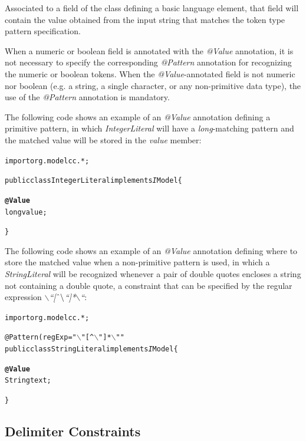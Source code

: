 \documentclass[a4paper,twoside,onecolumn]{article}
\newenvironment{colframe}{%
  \begin{Sbox} 
    \begin{minipage}{.8\columnwidth} 
}{%

  \end{minipage} 
  \end{Sbox} 
  \begin{center} 
    \fcolorbox{black}{MyGray}{\TheSbox} 
  \end{center} 
}
\newcommand{\an}[1]{\emph{#1}} %
\begin{document}
Associated to a field of the class defining a basic language element, that field will contain the value obtained from the input string that
matches the token type pattern specification.

When a numeric or boolean field is annotated with the \an{@Value} annotation, it is not necessary to specify the corresponding \an{@Pattern}
annotation for recognizing the numeric or boolean tokens. When the \an{@Value}-annotated field is not numeric nor boolean (e.g. a string, a
single character, or any non-primitive data type), the use of the \an{@Pattern} annotation is mandatory.

The following code shows an example of an \an{@Value} annotation defining a primitive pattern, in which \emph{IntegerLiteral} will have a \emph{long}-matching pattern and the matched value will be stored in the \emph{value} member:

\begin{colframe}
\begin{alltt}
import org.modelcc.*;

public class IntegerLiteral implements{\emph IModel} \{

  {\bf\unskip @Value}
  long value;

\}
\end{alltt}
\end{colframe}

The following code shows an example of an \an{@Value} annotation defining where to store the matched value when a non-primitive pattern is used, in which a \emph{StringLiteral} will be recognized whenever a pair of double quotes
encloses a string not containing a double quote, a constraint that can be specified by the regular expression \emph{$\backslash$``[$\mathbin{\char`\^}\backslash$``]*$\backslash$``}:

\begin{colframe}
\begin{alltt}
import org.modelcc.*;

@Pattern(regExp="\(\backslash\)"[^\(\backslash\)"]*\(\backslash\)""
public class StringLiteral implements{\emph IModel} \{

  {\bf\unskip @Value} 
  String text;

\}
\end{alltt}
\end{colframe}


\subsection{Delimiter Constraints}
\end{document}
